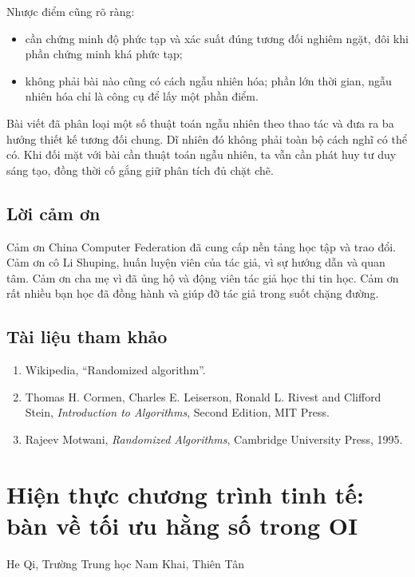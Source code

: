 \documentclass[11pt]{article}
\begin{document}
Nhược điểm cũng rõ ràng:
\begin{itemize}
  \item cần chứng minh độ phức tạp và xác suất đúng tương đối nghiêm ngặt, đôi
  khi phần chứng minh khá phức tạp;
  \item không phải bài nào cũng có cách ngẫu nhiên hóa; phần lớn thời gian, ngẫu
  nhiên hóa chỉ là công cụ để lấy một phần điểm.
\end{itemize}

Bài viết đã phân loại một số thuật toán ngẫu nhiên theo thao tác và đưa ra ba
hướng thiết kế tương đối chung. Dĩ nhiên đó không phải toàn bộ cách nghĩ có thể
có. Khi đối mặt với bài cần thuật toán ngẫu nhiên, ta vẫn cần phát huy tư duy
sáng tạo, đồng thời cố gắng giữ phân tích đủ chặt chẽ.

\subsection*{Lời cảm ơn}

Cảm ơn China Computer Federation đã cung cấp nền tảng học tập và trao đổi. Cảm
ơn cô Li Shuping, huấn luyện viên của tác giả, vì sự hướng dẫn và quan tâm. Cảm
ơn cha mẹ vì đã ủng hộ và động viên tác giả học thi tin học. Cảm ơn rất nhiều
bạn học đã đồng hành và giúp đỡ tác giả trong suốt chặng đường.

\subsection*{Tài liệu tham khảo}

\begin{enumerate}
  \item Wikipedia, ``Randomized algorithm''.
  \item Thomas H. Cormen, Charles E. Leiserson, Ronald L. Rivest and Clifford
  Stein, \emph{Introduction to Algorithms}, Second Edition, MIT Press.
  \item Rajeev Motwani, \emph{Randomized Algorithms}, Cambridge University
  Press, 1995.
\end{enumerate}

\section{Hiện thực chương trình tinh tế: bàn về tối ưu hằng số trong OI}

\begin{center}
He Qi, Trường Trung học Nam Khai, Thiên Tân
\end{center}
\end{document}
